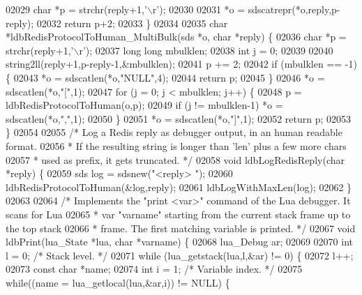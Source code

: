 \begin{DoxyCode}
{{{{{{{{{{{{{{{{{02029     \textcolor{keywordtype}{char} *p = strchr(reply+1,\textcolor{stringliteral}{'\(\backslash\)r'});
02030 
02031     *o = sdscatrepr(*o,reply,p-reply);
02032     \textcolor{keywordflow}{return} p+2;
02033 \}
02034 
02035 \textcolor{keywordtype}{char} *ldbRedisProtocolToHuman\_MultiBulk(sds *o, \textcolor{keywordtype}{char} *reply) \{
02036     \textcolor{keywordtype}{char} *p = strchr(reply+1,\textcolor{stringliteral}{'\(\backslash\)r'});
02037     \textcolor{keywordtype}{long} \textcolor{keywordtype}{long} mbulklen;
02038     \textcolor{keywordtype}{int} j = 0;
02039 
02040     string2ll(reply+1,p-reply-1,&mbulklen);
02041     p += 2;
02042     \textcolor{keywordflow}{if} (mbulklen == -1) \{
02043         *o = sdscatlen(*o,\textcolor{stringliteral}{"NULL"},4);
02044         \textcolor{keywordflow}{return} p;
02045     \}
02046     *o = sdscatlen(*o,\textcolor{stringliteral}{"["},1);
02047     \textcolor{keywordflow}{for} (j = 0; j < mbulklen; j++) \{
02048         p = ldbRedisProtocolToHuman(o,p);
02049         \textcolor{keywordflow}{if} (j != mbulklen-1) *o = sdscatlen(*o,\textcolor{stringliteral}{","},1);
02050     \}
02051     *o = sdscatlen(*o,\textcolor{stringliteral}{"]"},1);
02052     \textcolor{keywordflow}{return} p;
02053 \}
02054 
02055 \textcolor{comment}{/* Log a Redis reply as debugger output, in an human readable format.}
02056 \textcolor{comment}{ * If the resulting string is longer than 'len' plus a few more chars}
02057 \textcolor{comment}{ * used as prefix, it gets truncated. */}
02058 \textcolor{keywordtype}{void} ldbLogRedisReply(\textcolor{keywordtype}{char} *reply) \{
02059     sds log = sdsnew(\textcolor{stringliteral}{"<reply> "});
02060     ldbRedisProtocolToHuman(&log,reply);
02061     ldbLogWithMaxLen(log);
02062 \}
02063 
02064 \textcolor{comment}{/* Implements the "print <var>" command of the Lua debugger. It scans for Lua}
02065 \textcolor{comment}{ * var "varname" starting from the current stack frame up to the top stack}
02066 \textcolor{comment}{ * frame. The first matching variable is printed. */}
02067 \textcolor{keywordtype}{void} ldbPrint(lua\_State *lua, \textcolor{keywordtype}{char} *varname) \{
02068     lua\_Debug ar;
02069 
02070     \textcolor{keywordtype}{int} l = 0; \textcolor{comment}{/* Stack level. */}
02071     \textcolor{keywordflow}{while} (lua\_getstack(lua,l,&ar) != 0) \{
02072         l++;
02073         \textcolor{keyword}{const} \textcolor{keywordtype}{char} *name;
02074         \textcolor{keywordtype}{int} i = 1; \textcolor{comment}{/* Variable index. */}
02075         \textcolor{keywordflow}{while}((name = lua\_getlocal(lua,&ar,i)) != NULL) \{
}}}}}}}}}}}}}}}}}
\end{DoxyCode}
